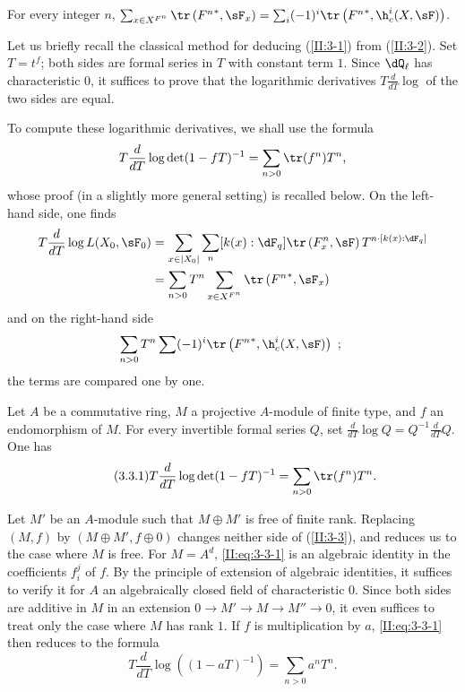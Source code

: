 \documentclass[oneside]{book}
\begin{document}
\begin{theorem_}\label{II:3-2}
For every integer $n$,
$\sum_{x\in X^{F^n}} \tr\left({F^n}^*,\sF_x\right) = \sum_i (-1)^i \tr\left({F^n}^*,\h_c^i(X,\sF)\right)$.
\end{theorem_}






Let us briefly recall the classical method for deducing (\ref{II:3-1}) from
(\ref{II:3-2}). Set $T=t^f$; both sides are formal series in $T$ with
constant term $1$. Since $\dQ_\ell$ has characteristic $0$, it suffices to
prove that the logarithmic derivatives $T\frac{d}{dT}\log$ of the two sides
are equal.

To compute these logarithmic derivatives, we shall use the formula
\[
  T \frac{d}{dT}\log\det(1-f T)^{-1} = \sum_{n>0} \tr(f^n) T^n \text{,}
\]
whose proof (in a slightly more general setting) is recalled below. On the
left-hand side, one finds
\begin{align*}
  T\frac{d}{dT}\log L(X_0,\sF_0)
    &= \sum_{x\in |X_0|} \sum_n [k(x):\dF_q] \tr\left(F_x^n,\sF\right) T^{n\cdot[k(x):\dF_q]} \\
    &= \sum_{n>0} T^n \sum_{x\in X^{F^n}} \tr\left({F^n}^*,\sF_x\right)
\end{align*}
and on the right-hand side
\[
  \sum_{n>0} T^n \sum (-1)^i \tr\left({F^n}^*,\h_c^i(X,\sF)\right) \text{ ; }
\]
the terms are compared one by one.






\begin{proposition_}\label{II:3-3}
Let $A$ be a commutative ring, $M$ a projective $A$-module of finite type,
and $f$ an endomorphism of $M$. For every invertible formal series $Q$, set
$\frac{d}{dT}\log Q = Q^{-1}\frac{d}{dT}Q$. One has
\begin{equation*}\tag{3.3.1}\label{II:eq:3-3-1}
  T\frac{d}{dT}\log\det(1-f T)^{-1} = \sum_{n>0} \tr(f^n) T^n \text{.}
\end{equation*}
\end{proposition_}

Let $M'$ be an $A$-module such that $M\oplus M'$ is free of finite rank.
Replacing $(M,f)$ by $(M\oplus M',f\oplus 0)$ changes neither side of
(\ref{II:3-3}), and reduces us to the case where $M$ is free. For $M=A^d$,
\eqref{II:eq:3-3-1} is an algebraic identity in the coefficients $f_i^j$ of
$f$. By the principle of extension of algebraic identities, it suffices to
verify it for $A$ an algebraically closed field of characteristic $0$. Since
both sides are additive in $M$ in an extension
$0\to M'\to M\to M''\to 0$, it even suffices to treat only the case where
$M$ has rank $1$. If $f$ is multiplication by $a$,
\eqref{II:eq:3-3-1} then reduces to the formula
\[
  T\frac{d}{dT}\log\left((1-a T)^{-1}\right) = \sum_{n>0} a^n T^n \text{.}
\]
\end{document}
